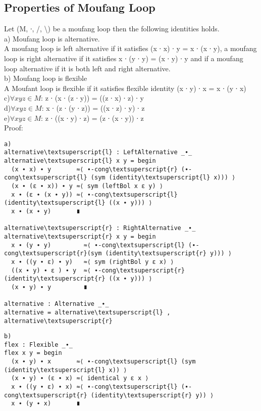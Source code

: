 \subsection{Properties of Moufang Loop}
Let (M, ∙, /, \textbackslash ) be a moufang loop then the following identities holds.\\
a) Moufang loop is alternative. \\
A moufang loop is left alternative if it satisfies (x ∙ x) ∙ y = x ∙ (x ∙ y), a moufang loop is right alternative if it satisfies x ∙ (y ∙ y) = (x ∙ y) ∙ y and if a moufang loop alternative if it is both left and right alternative. \\
b) Moufang loop is flexible \\
A Moufant loop is flexible if it satisfies flexible identity (x ∙ y) ∙ x = x ∙ (y ∙ x)\\
c)\(\forall x y z \in M\): z ∙ (x ∙ (z ∙ y)) = ((z ∙ x) ∙ z) ∙ y\\
d)\(\forall x y z \in M\): x ∙ (z ∙ (y ∙ z)) = ((x ∙ z) ∙ y) ∙ z \\
e)\(\forall x y z \in M\): z ∙ ((x ∙ y) ∙ z) = (z ∙ (x ∙ y)) ∙ z \\
Proof:
\begin{Verbatim}[commandchars=\\\{\},samepage=true]
a)
alternative\textsuperscript{l} : LeftAlternative _∙_
alternative\textsuperscript{l} x y = begin
  (x ∙ x) ∙ y       ≈⟨ ∙-cong\textsuperscript{r} (∙-cong\textsuperscript{l} (sym (identity\textsuperscript{l} x))) ⟩
  (x ∙ (ε ∙ x)) ∙ y ≈⟨ sym (leftBol x ε y) ⟩
  x ∙ (ε ∙ (x ∙ y)) ≈⟨ ∙-cong\textsuperscript{l} (identity\textsuperscript{l} ((x ∙ y))) ⟩
  x ∙ (x ∙ y)       ∎

alternative\textsuperscript{r} : RightAlternative _∙_
alternative\textsuperscript{r} x y = begin
  x ∙ (y ∙ y)         ≈⟨ ∙-cong\textsuperscript{l} (∙-cong\textsuperscript{r}(sym (identity\textsuperscript{r} y))) ⟩
  x ∙ ((y ∙ ε) ∙ y)   ≈⟨ sym (rightBol y ε x) ⟩
  ((x ∙ y) ∙ ε ) ∙ y  ≈⟨ ∙-cong\textsuperscript{r} (identity\textsuperscript{r} ((x ∙ y))) ⟩
  (x ∙ y) ∙ y         ∎

alternative : Alternative _∙_
alternative = alternative\textsuperscript{l} , alternative\textsuperscript{r}
\end{Verbatim}

\begin{Verbatim}[commandchars=\\\{\}]
b)
flex : Flexible _∙_
flex x y = begin
  (x ∙ y) ∙ x       ≈⟨ ∙-cong\textsuperscript{l} (sym (identity\textsuperscript{l} x)) ⟩
  (x ∙ y) ∙ (ε ∙ x) ≈⟨ identical y ε x ⟩
  x ∙ ((y ∙ ε) ∙ x) ≈⟨ ∙-cong\textsuperscript{l} (∙-cong\textsuperscript{r} (identity\textsuperscript{r} y)) ⟩
  x ∙ (y ∙ x)       ∎
\end{Verbatim}

